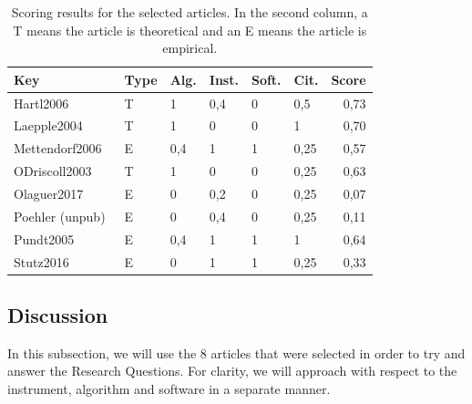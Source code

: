 \begin{table}[htb]
    \centering
    \caption{Scoring results for the selected articles. In the second
    column, a T means the article is theoretical and an E means the
    article is empirical.}
    \label{tab:scores}
    \begin{tabularx}{\textwidth}{lXXXXXr}
        \toprule
        \textbf{Key} & \textbf{Type} & \textbf{Alg.} & \textbf{Inst.} &
        \textbf{Soft.} & \textbf{Cit.} & \textbf{Score}\\
        \midrule
        Hartl2006~\cite{Hartl2006} & T & 1 & 0,4 & 0 & 0,5 & 0,73\\
        Laepple2004~\cite{Laepple2004} & T & 1 & 0 & 0 & 1 & 0,70\\
        Mettendorf2006~\cite{Mettendorf2006} & E & 0,4 & 1 & 1 & 0,25 & 0,57\\
        ODriscoll2003~\cite{ODriscoll2003} & T & 1 & 0 & 0 & 0,25 & 0,63\\
        Olaguer2017~\cite{Olaguer2017} & E & 0 & 0,2 & 0 & 0,25 & 0,07\\
        Poehler (unpub)~\cite{Poehler} & E & 0 & 0,4 & 0 & 0,25 & 0,11\\
        Pundt2005~\cite{Pundt2005} & E & 0,4 & 1 & 1 & 1 & 0,64\\
        Stutz2016~\cite{Stutz2016} & E & 0 & 1 & 1 & 0,25 & 0,33\\ 
        \bottomrule
    \end{tabularx}
\end{table}



\subsection{Discussion}
\label{sub:discussion}

In this subsection, we will use the 8 articles that were selected in
order to try and answer the Research Questions. For clarity, we will
approach with respect to the instrument, algorithm and software in a
separate manner.

